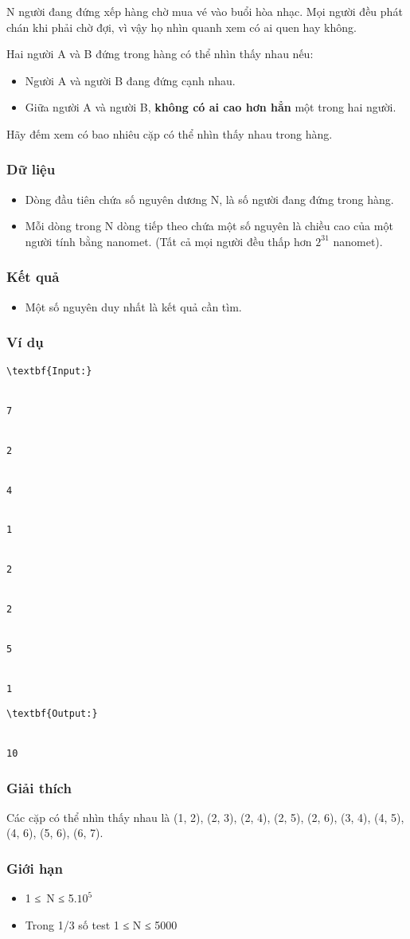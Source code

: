 



   N người đang đứng xếp hàng chờ mua vé vào buổi hòa nhạc. Mọi người đều phát chán khi phải chờ đợi, vì vậy họ nhìn quanh xem có ai quen hay không.  

   Hai người A và B đứng trong hàng có thể nhìn thấy nhau nếu:  
\begin{itemize}
	\item     Người A và người B đang đứng cạnh nhau.   
	\item     Giữa người A và người B,    \textbf{     không có ai cao hơn hẳn    }    một trong hai người.   
\end{itemize}

   Hãy đếm xem có bao nhiêu cặp có thể nhìn thấy nhau trong hàng.  

\subsubsection{   Dữ liệu  }
\begin{itemize}
	\item     Dòng đầu tiên chứa số nguyên dương N, là số người đang đứng trong hàng.   
	\item     Mỗi dòng trong N dòng tiếp theo chứa một số nguyên là chiều cao của một người tính bằng nanomet. (Tất cả mọi người đều thấp hơn $2^{31}$    nanomet).   
\end{itemize}

\subsubsection{   Kết quả  }
\begin{itemize}
	\item     Một số nguyên duy nhất là kết quả cần tìm.   
\end{itemize}

\subsubsection{   Ví dụ  }
\begin{verbatim}
\textbf{Input:}


7


2


4


1


2


2


5


1 \end{verbatim}
\begin{verbatim}
\textbf{Output:}


10\end{verbatim}

\subsubsection{   Giải thích  }

   Các cặp có thể nhìn thấy nhau là (1, 2), (2, 3), (2, 4), (2, 5), (2, 6), (3, 4), (4, 5), (4, 6), (5, 6), (6, 7).  

\subsubsection{   Giới hạn  }
\begin{itemize}
	\item     1 ≤ N ≤ 5.$10^{5}$
	\item     Trong 1/3 số test 1 ≤ N ≤ 5000   
\end{itemize}
